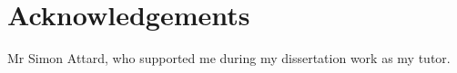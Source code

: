 
\chapter*{\centering Acknowledgements}
\begin{spacing}{1.5}
\vspace{-0.2in}
\setlength{\parskip}{0.3in}
\setlength{\parindent}{0in}


Mr Simon Attard, who supported me during my dissertation work as my tutor.

\end{spacing}
\newpage
